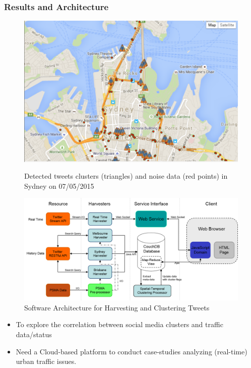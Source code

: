 \begin{frame}
    \frametitle{Results and Architecture}
    \begin{figure}[h]
       \begin{minipage}{0.5\linewidth}
         \centering
         \includegraphics[width=.8\linewidth]{resource/figures/harvester_cluster_3.png}
         \caption{Detected tweets clusters (triangles) and noise data (red points) in Sydney on 07/05/2015}
       \end{minipage}\hfill
       \begin{minipage}{0.5\linewidth}
         \centering
         \includegraphics[width=\linewidth]{resource/figures/harvester_architecture.png}
         \caption{Software Architecture for Harvesting and Clustering Tweets}
       \end{minipage}
    \end{figure}
    \vspace{-0.3cm}
    \begin{itemize}
        \item To explore the correlation between social media clusters and traffic data/status
        \item Need a Cloud-based platform to conduct case-studies analyzing (real-time) urban traffic issues.
    \end{itemize}
\end{frame}

